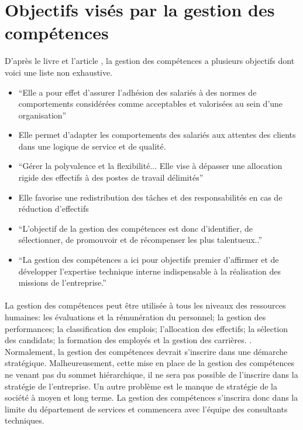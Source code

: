 \section{Objectifs visés par la gestion des compétences}
D'après le livre\citep{gestionressourceshumaine2007} et l'article \citep{delobbe}, la gestion des compétences a plusieurs objectifs dont voici une liste non exhaustive.
\begin{itemize}
    \item \enquote{Elle a pour effet d'assurer l'adhésion des salariés à des normes de comportements considérées comme acceptables et valorisées au sein d'une organisation}\citep[p.40]{delobbe}
    \item Elle permet d'adapter les comportements des salariés aux attentes des clients dans une logique de service et de qualité. \citep[182]{gestionressourceshumaine2007}
    \item \enquote{Gérer la polyvalence et la flexibilité... Elle vise à dépasser une allocation rigide des effectifs à des postes de travail délimités}\citep[p.41]{delobbe}
    \item Elle favorise une redistribution des tâches et des responsabilités en cas de réduction d'effectifs \citep[182]{gestionressourceshumaine2007}
    \item  \enquote{L'objectif de la gestion des compétences est donc d'identifier, de sélectionner, de promouvoir et de récompenser les plus talentueux..}\citep[p.43]{delobbe}
    \item  \enquote{La gestion des compétences a ici pour objectifs premier d'affirmer et de développer l'expertise technique interne indispensable à la réalisation des missions de l'entreprise.} \citep[p.45]{delobbe}

\end{itemize}

\paragraph{}La gestion des compétences peut être utilisée à tous les niveaux des ressources humaines: les évaluations et la rémunération du personnel; la gestion des performances; la classification des emplois; l'allocation des effectifs; la sélection des candidats; la formation des employés et la gestion des carrières. \citep[p.32]{delobbe}. Normalement, la gestion des compétences devrait s'inscrire dans une démarche stratégique. Malheureusement, cette mise en place de la gestion des compétences ne venant pas du sommet hiérarchique, il ne sera pas possible de l'inscrire dans la stratégie de l'entreprise. Un autre problème est le manque de stratégie de la société à moyen et long terme.  La gestion des compétences s'inscrira donc dans la limite du département de services et commencera avec l'équipe des consultants techniques. 

